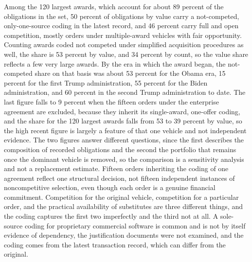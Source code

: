 \documentclass[12pt]{article}
\theoremstyle{remark}
\begin{document}
Among the 120 largest awards, which account for about 89 percent of the obligations in the set, 50 percent of obligations by value carry a not-competed, only-one-source coding in the latest record, and 46 percent carry full and open competition, mostly orders under multiple-award vehicles with fair opportunity. Counting awards coded not competed under simplified acquisition procedures as well, the share is 53 percent by value, and 34 percent by count, so the value share reflects a few very large awards. By the era in which the award began, the not-competed share on that basis was about 53 percent for the Obama era, 15 percent for the first Trump administration, 55 percent for the Biden administration, and 60 percent in the second Trump administration to date. The last figure falls to 9 percent when the fifteen orders under the enterprise agreement are excluded, because they inherit its single-award, one-offer coding, and the share for the 120 largest awards falls from 53 to 39 percent by value, so the high recent figure is largely a feature of that one vehicle and not independent evidence. The two figures answer different questions, since the first describes the composition of recorded obligations and the second the portfolio that remains once the dominant vehicle is removed, so the comparison is a sensitivity analysis and not a replacement estimate. Fifteen orders inheriting the coding of one agreement reflect one structural decision, not fifteen independent instances of noncompetitive selection, even though each order is a genuine financial commitment. Competition for the original vehicle, competition for a particular order, and the practical availability of substitutes are three different things, and the coding captures the first two imperfectly and the third not at all. A sole-source coding for proprietary commercial software is common and is not by itself evidence of dependency, the justification documents were not examined, and the coding comes from the latest transaction record, which can differ from the original.
\end{document}
